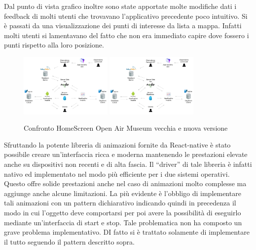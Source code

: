 Dal punto di vista grafico inoltre sono state apportate molte modifiche dati i feedback di molti utenti che trovavano l’applicativo precedente poco intuitivo. Si è passati da una visualizzazione dei punti di interesse da lista a mappa. Infatti molti utenti si lamentavano del fatto che non era immediato capire dove fossero i punti rispetto alla loro posizione.\vspace{5mm}

\begin{figure}[h]
\centering
\includegraphics[width=0.4\textwidth]{images/SchemaOpenAirMuseum.png}
\includegraphics[width=0.4\textwidth]{images/SchemaOpenAirMuseum.png}
\caption{Confronto HomeScreen Open Air Museum vecchia e nuova versione}
\end{figure}
\vspace{5mm}
Sfruttando la potente libreria di animazioni fornite da React-native è stato possibile creare un'interfaccia ricca e moderna mantenendo le prestazioni elevate anche su dispositivi non recenti e di alta fascia. Il “driver” di tale libreria è infatti nativo ed implementato nel modo più efficiente per i due sistemi operativi. Questo offre solide prestazioni anche nel caso di animazioni molto complesse ma aggiunge anche alcune limitazioni. La più evidente è l’obbligo di implementare tali animazioni con un pattern dichiarativo indicando quindi in precedenza il modo in cui l’oggetto deve comportarsi per poi avere la possibilità di eseguirlo mediante un'interfaccia di start e stop. Tale problematica non ha composto un grave problema implementativo. DI fatto si è trattato solamente di implementare il tutto seguendo il pattern descritto sopra.\vspace{5mm}

